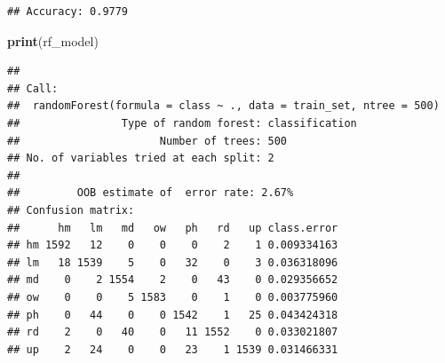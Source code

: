 \documentclass[
]{article}
\newenvironment{Shaded}{\begin{snugshade}}{\end{snugshade}}
\newcommand{\CommentTok}[1]{\textcolor[rgb]{0.56,0.35,0.01}{\textit{#1}}}
\newcommand{\FunctionTok}[1]{\textcolor[rgb]{0.13,0.29,0.53}{\textbf{#1}}}
\newcommand{\NormalTok}[1]{#1}
\newcommand{\SpecialCharTok}[1]{\textcolor[rgb]{0.81,0.36,0.00}{\textbf{#1}}}
\begin{document}
\begin{verbatim}
## Accuracy: 0.9779
\end{verbatim}

\begin{Shaded}
\begin{Highlighting}[]
\FunctionTok{print}\NormalTok{(rf\_model)}
\end{Highlighting}
\end{Shaded}

\begin{verbatim}
## 
## Call:
##  randomForest(formula = class ~ ., data = train_set, ntree = 500) 
##                Type of random forest: classification
##                      Number of trees: 500
## No. of variables tried at each split: 2
## 
##         OOB estimate of  error rate: 2.67%
## Confusion matrix:
##      hm   lm   md   ow   ph   rd   up class.error
## hm 1592   12    0    0    0    2    1 0.009334163
## lm   18 1539    5    0   32    0    3 0.036318096
## md    0    2 1554    2    0   43    0 0.029356652
## ow    0    0    5 1583    0    1    0 0.003775960
## ph    0   44    0    0 1542    1   25 0.043424318
## rd    2    0   40    0   11 1552    0 0.033021807
## up    2   24    0    0   23    1 1539 0.031466331
\end{verbatim}

\begin{Shaded}
\end{Shaded}
\end{document}
